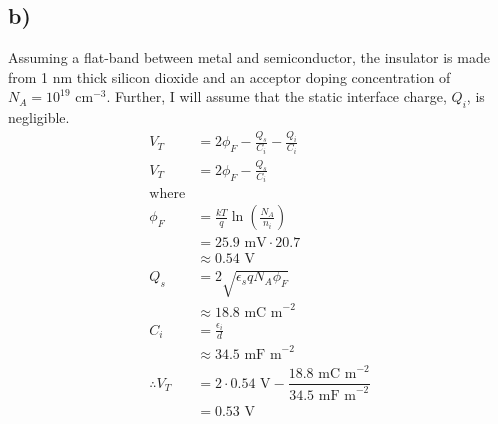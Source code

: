 \subsection*{b)}
Assuming a flat-band between metal and semiconductor, the insulator is made from 1 nm thick silicon dioxide and an acceptor doping concentration of 
$N_A = 10^{19} \textrm{ cm}^{-3}$. Further, I will assume that the static interface charge, $Q_i$, is negligible.
\[
\begin{aligned}
	V_T &= 2 \phi_F - \frac{Q_s}{C_i} - \frac{Q_i}{C_i} \\
	V_T &= 2 \phi_F - \frac{Q_s}{C_i} \\
	\textrm{where}\\
	\phi_F	&= \frac{k T}{q} \ln \left(\frac{N_A}{n_i}\right) \\
		&= 25.9 \textrm{ mV} \cdot 20.7 \\
		&\approx 0.54 \textrm{ V} \\
	Q_s &= 2\sqrt{\epsilon_s q N_A \phi_F} \\
		&\approx 18.8 \textrm{ mC m}^{-2}\\
	C_i &= \frac{\epsilon_i}{d} \\
		&\approx 34.5 \textrm{ mF m}^{-2} \\
		\therefore V_T &= 2 \cdot 0.54 \textrm{ V} -
		 \dfrac{18.8  \textrm{ mC m}^{-2}}{34.5 \textrm{ mF m}^{-2}} \\
		 &= 0.53 \textrm{ V}
\end{aligned}
\]